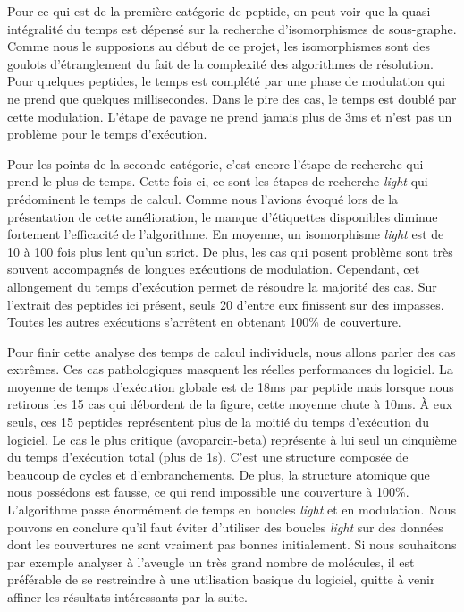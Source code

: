 Pour ce qui est de la première catégorie de peptide, on peut voir que la quasi-intégralité du temps est dépensé sur la recherche d'isomorphismes de sous-graphe.
Comme nous le supposions au début de ce projet, les isomorphismes sont des goulots d'étranglement du fait de la complexité des algorithmes de résolution.
Pour quelques peptides, le temps est complété par une phase de modulation qui ne prend que quelques millisecondes.
Dans le pire des cas, le temps est doublé par cette modulation.
L'étape de pavage ne prend jamais plus de 3ms et n'est pas un problème pour le temps d'exécution.

Pour les points de la seconde catégorie, c'est encore l'étape de recherche qui prend le plus de temps.
Cette fois-ci, ce sont les étapes de recherche \textit{light} qui prédominent le temps de calcul.
Comme nous l'avions évoqué lors de la présentation de cette amélioration, le manque d'étiquettes disponibles diminue fortement l'efficacité de l'algorithme.
En moyenne, un isomorphisme \textit{light} est de 10 à 100 fois plus lent qu'un strict.
De plus, les cas qui posent problème sont très souvent accompagnés de longues exécutions de modulation.
Cependant, cet allongement du temps d'exécution permet de résoudre la majorité des cas.
Sur l'extrait des peptides ici présent, seuls 20 d'entre eux finissent sur des impasses.
Toutes les autres exécutions s'arrêtent en obtenant 100\% de couverture.

Pour finir cette analyse des temps de calcul individuels, nous allons parler des cas extrêmes.
Ces cas pathologiques masquent les réelles performances du logiciel.
La moyenne de temps d'exécution globale est de 18ms par peptide mais lorsque nous retirons les 15 cas qui débordent de la figure, cette moyenne chute à 10ms.
À eux seuls, ces 15 peptides représentent plus de la moitié du temps d'exécution du logiciel.
Le cas le plus critique (avoparcin-beta) représente à lui seul un cinquième du temps d'exécution total (plus de 1s).
C'est une structure composée de beaucoup de cycles et d'embranchements. De plus, la structure atomique que nous possédons est fausse, ce qui rend impossible une couverture à 100\%.
L'algorithme passe énormément de temps en boucles \textit{light} et en modulation.
Nous pouvons en conclure qu'il faut éviter d'utiliser des boucles \textit{light} sur des données dont les couvertures ne sont vraiment pas bonnes initialement.
Si nous souhaitons par exemple analyser à l'aveugle un très grand nombre de molécules, il est préférable de se restreindre à une utilisation basique du logiciel, quitte à venir affiner les résultats intéressants par la suite.








